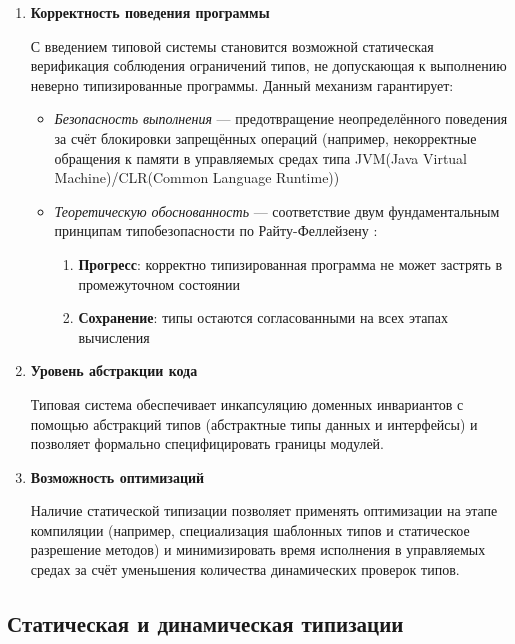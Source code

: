 \begin{enumerate}[label=\arabic*), leftmargin=*]
    \item \textbf{Корректность поведения программы}

    С введением типовой системы становится возможной статическая верификация соблюдения ограничений типов, не допускающая к выполнению неверно типизированные программы. Данный механизм гарантирует:

    \begin{itemize}
        \item \textit{Безопасность выполнения} — предотвращение неопределённого поведения за счёт блокировки запрещённых операций (например, некорректные обращения к памяти в управляемых средах типа JVM(Java Virtual Machine)/CLR(Common Language Runtime))
        \item \textit{Теоретическую обоснованность} — соответствие двум фундаментальным принципам типобезопасности по Райту-Феллейзену \cite{wright1994}:
        \begin{enumerate}[label=\arabic*., leftmargin=*]
            \item \textbf{Прогресс}: корректно типизированная программа не может застрять в промежуточном состоянии
            \item \textbf{Сохранение}: типы остаются согласованными на всех этапах вычисления
        \end{enumerate}
    \end{itemize}

    \item \textbf{Уровень абстракции кода}

    Типовая система обеспечивает инкапсуляцию доменных инвариантов с помощью абстракций типов (абстрактные типы данных и интерфейсы) и позволяет формально специфицировать границы модулей.

    \item \textbf{Возможность оптимизаций}

    Наличие статической типизации позволяет применять оптимизации на этапе компиляции (например, специализация шаблонных типов и статическое разрешение методов) и минимизировать время исполнения в управляемых средах за счёт уменьшения количества динамических проверок типов.
\end{enumerate}

\subsection{Статическая и динамическая типизации}

